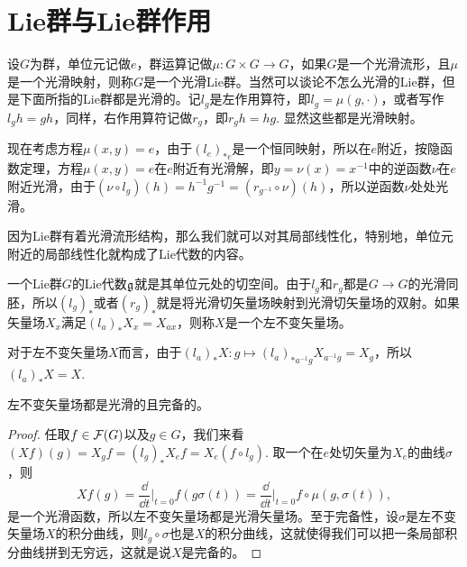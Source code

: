 \section{Lie群与Lie群作用}


\begin{para}[Lie群]
设$G$为群，单位元记做$e$，群运算记做$\mu:G\times G\to G$，如果$G$是一个光滑流形，且$\mu$是一个光滑映射，则称$G$是一个光滑Lie群。当然可以谈论不怎么光滑的Lie群，但是下面所指的Lie群都是光滑的。记$l_g$是左作用算符，即$l_g=\mu(g,\cdot)$，或者写作$l_gh=gh$，同样，右作用算符记做$r_g$，即$r_gh=hg$. 显然这些都是光滑映射。

现在考虑方程$\mu(x,y)=e$，由于$(l_e)_{*e}$是一个恒同映射，所以在$e$附近，按隐函数定理，方程$\mu(x,y)=e$在$e$附近有光滑解，即$y=\nu(x)=x^{-1}$中的逆函数$\nu$在$e$附近光滑，由于$(\nu\circ l_g)(h)=h^{-1}g^{-1}=(r_{g^{-1}}\circ \nu)(h)$，所以逆函数$\nu$处处光滑。
\end{para}

因为Lie群有着光滑流形结构，那么我们就可以对其局部线性化，特别地，单位元附近的局部线性化就构成了Lie代数的内容。

\begin{para}[Lie代数与左不变矢量场]
一个Lie群$G$的Lie代数${\mathfrak{g}}$就是其单位元处的切空间。由于$l_g$和$r_g$都是$G\to G$的光滑同胚，所以$(l_g)_*$或者$(r_g)_*$就是将光滑切矢量场映射到光滑切矢量场的双射。如果矢量场$X_x$满足$(l_a)_*X_x=X_{ax}$，则称$X$是一个左不变矢量场。

对于左不变矢量场$X$而言，由于$(l_a)_*X:g\mapsto (l_a)_{*a^{-1}g}X_{a^{-1}g}=X_g$，所以$(l_a)_*X=X$.
\end{para}

\begin{lem}
左不变矢量场都是光滑的且完备的。
\end{lem}

\begin{proof}
任取$f\in\mathcal{F}(G)$以及$g\in G$，我们来看$(Xf)(g)=X_gf=(l_g)_{*}X_ef=X_e(f\circ l_g)$. 取一个在$e$处切矢量为$X_e$的曲线$\sigma$，则
\[
	Xf(g)=\frac{\dd }{\dd t}\bigg|_{t=0}f(g\sigma(t))=\frac{\dd }{\dd t}\bigg|_{t=0}f\circ \mu(g,\sigma(t)),
\]
是一个光滑函数，所以左不变矢量场都是光滑矢量场。至于完备性，设$\sigma$是左不变矢量场$X$的积分曲线，则$l_g\circ \sigma$也是$X$的积分曲线，这就使得我们可以把一条局部积分曲线拼到无穷远，这就是说$X$是完备的。
\end{proof}

